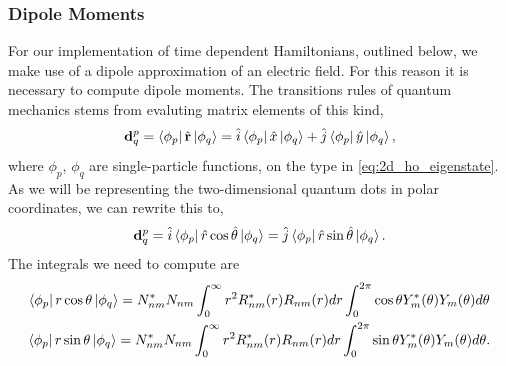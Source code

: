 \subsubsection{Dipole Moments}
For our implementation of time dependent Hamiltonians, outlined below, we make use of 
a dipole approximation of an electric field. For this reason it is necessary to compute 
dipole moments. The transitions rules of quantum mechanics stems from evaluting matrix
elements of this kind,
\begin{equation}
    \vb{d}^p_q = \bra{\phi_p} \hat{\vb{r}} \ket{\phi_q} 
        = \hat{i}\bra{\phi_p} \hat{x} \ket{\phi_q} + \hat{j}  \bra{\phi_p} \hat{y} \ket{\phi_q},
\end{equation}
where $\phi_p$, $\phi_q$ are single-particle functions, on the type in \autoref{eq:2d_ho_eigenstate}.
As we will be representing the two-dimensional quantum dots in polar coordinates,
we can rewrite this to,
\begin{equation}
    \vb{d}^p_q 
        = \hat{i}\bra{\phi_p} \hat{r}\cos{\hat{\theta}}\ket{\phi_q}
        = \hat{j}\bra{\phi_p} \hat{r}\sin{\hat{\theta}}\ket{\phi_q}.
\end{equation}
The integrals we need to compute are
\begin{gather}
    \bra{\phi_p} r \cos\theta \ket{\phi_q} 
        = 
        N_{nm}^* N_{nm} 
        \int_0^\infty r^2 R^*_{nm}(r)R_{nm}(r) dr
        \int_0^{2\pi} \cos\theta Y^*_{m}(\theta)Y_{m}(\theta)d\theta \\
    \bra{\phi_p} r \sin\theta \ket{\phi_q} 
        = 
        N_{nm}^* N_{nm} 
        \int_0^\infty r^2 R^*_{nm}(r)R_{nm}(r) dr
        \int_0^{2\pi} \sin\theta Y^*_{m}(\theta)Y_{m}(\theta)d\theta.
\end{gather}

